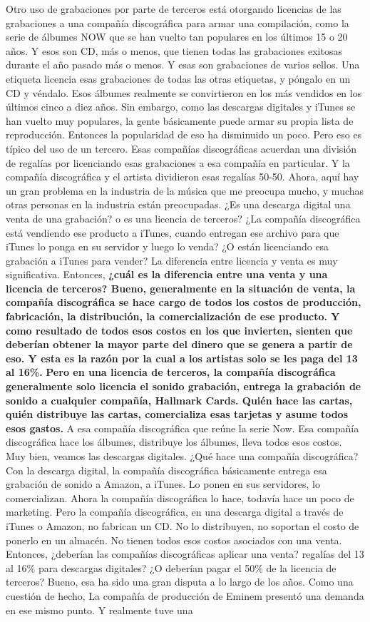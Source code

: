 \documentclass[10pt]{book}
\begin{document}
Otro uso de grabaciones por parte de terceros está otorgando licencias de las grabaciones a una compañía discográfica para armar una compilación, como la serie de álbumes NOW que se han vuelto tan populares en los últimos 15 o 20 años. Y esos son CD, más o menos, que tienen todas las grabaciones exitosas durante el año pasado más o menos. Y esas son grabaciones de varios sellos. Una etiqueta licencia esas grabaciones de todas las otras etiquetas, y póngalo en un CD y véndalo. Esos álbumes realmente se convirtieron en los más vendidos en los últimos cinco a diez años. Sin embargo, como las descargas digitales y iTunes se han vuelto muy populares, la gente básicamente puede armar su propia lista de reproducción. Entonces la popularidad de eso ha disminuido un poco. Pero eso es típico del uso de un tercero. Esas compañías discográficas acuerdan una división de regalías por licenciando esas grabaciones a esa compañía en particular. Y la compañía discográfica y el artista dividieron esas regalías 50-50. Ahora, aquí hay un gran problema en la industria de la música que me preocupa mucho, y muchas otras personas en la industria están preocupadas. ¿Es una descarga digital una venta de una grabación?  o es una licencia de terceros? ¿La compañía discográfica está vendiendo ese producto a iTunes, cuando entregan ese archivo para que iTunes lo ponga en su servidor y luego lo venda? ¿O están licenciando esa grabación a iTunes para vender? La diferencia entre licencia y venta es muy significativa. Entonces, \textbf{¿cuál es la diferencia entre una venta y una licencia de terceros? Bueno, generalmente en la situación de venta, la compañía discográfica se hace cargo de todos los costos de producción, fabricación, la distribución, la comercialización de ese producto. Y como resultado de todos esos costos en los que invierten, sienten que deberían obtener la mayor parte del dinero que se genera a partir de eso. Y esta es la razón por la cual a los artistas solo se les paga del 13 al 16\%.}\textbf{ Pero en una licencia de terceros, la compañía discográfica generalmente solo licencia el sonido grabación, entrega la grabación de sonido a cualquier compañía, Hallmark Cards. Quién hace las cartas, quién distribuye las cartas, comercializa esas tarjetas y asume todos esos gastos.} A esa compañía discográfica que reúne la serie Now. Esa compañía discográfica hace los álbumes, distribuye los álbumes, lleva todos esos costos. Muy bien, veamos las descargas digitales. ¿Qué hace una compañía discográfica? Con la descarga digital, la compañía discográfica básicamente entrega esa grabación de sonido a Amazon, a iTunes. Lo ponen en sus servidores, lo comercializan. Ahora la compañía discográfica lo hace, todavía hace un poco de marketing. Pero la compañía discográfica, en una descarga digital a través de iTunes o Amazon, no fabrican un CD. No lo distribuyen, no soportan el costo de ponerlo en un almacén. No tienen todos esos costos asociados con una venta. Entonces, ¿deberían las compañías discográficas aplicar una venta? regalías del 13 al 16\% para descargas digitales? ¿O deberían pagar el 50\% de la licencia de terceros? Bueno, esa ha sido una gran disputa a lo largo de los años. Como una cuestión de hecho, La compañía de producción de Eminem presentó una demanda en ese mismo punto. Y realmente tuve una 
\end{document}
